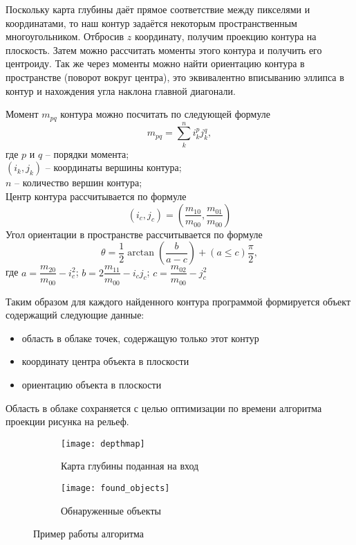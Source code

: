         Поскольку карта глубины даёт прямое соответствие между пикселями и координатами, то наш контур задаётся некоторым пространственным многоугольником. Отбросив $ z $ координату, получим проекцию контура на плоскость. Затем можно рассчитать моменты этого контура и получить его центроиду. Так же через моменты можно найти ориентацию контура в пространстве (поворот вокруг центра), это эквивалентно вписыванию эллипса в контур и нахождения угла наклона главной диагонали.
        
        Момент $ m_{pq} $ контура можно посчитать по следующей формуле
        \begin{equation}
            m_{pq} = \sum\limits_{k}^{n}i_k^p j_k^q,
        \end{equation}
        где $ p $ и $ q $ -- порядки момента;\\
        $ \left(i_k, j_k\right) $ -- координаты вершины контура;\\
        $ n $ -- количество вершин контура;\\
        Центр контура рассчитывается по формуле
        \begin{equation}
            (i_c,j_c) = \left(\dfrac{m_{10}}{m_{00}}, \dfrac{m_{01}}{m_{00}}\right)
        \end{equation}
        Угол ориентации в пространстве рассчитывается по формуле
        \begin{equation}
            \theta = \dfrac{1}{2}\arctan\left(\dfrac{b}{a-c}\right) + \left(a\le c\right)\dfrac{\pi}{2},
        \end{equation}
        где $ a = \dfrac{m_{20}}{m_{00}} - i_c^2 $; 
        $ b = 2\dfrac{m_{11}}{m_{00}} - i_cj_c $; 
        $ c = \dfrac{m_{02}}{m_{00}} - j_c^2 $
        
        Таким образом для каждого найденного контура программой формируется объект содержащий следующие данные:
        \begin{itemize}
            \item область в облаке точек, содержащую только этот контур
            \item координату центра объекта в плоскости
            \item ориентацию объекта в плоскости
        \end{itemize}
        Область в облаке сохраняется с целью оптимизации по времени алгоритма проекции рисунка на рельеф.
        
        \begin{figure}[H]
            \begin{subfigure}{0.5\linewidth}
                \texttt{[image: depthmap]}
                \caption{Карта глубины поданная на вход}
            \end{subfigure}
            \begin{subfigure}{0.5\linewidth}
                \texttt{[image: found\_objects]}
                \caption{Обнаруженные объекты}
            \end{subfigure}
            \caption{Пример работы алгоритма}
        \end{figure}
        
